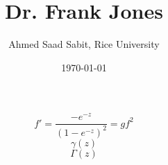 \documentclass[letter]{article}
\title{Dr. Frank Jones}
\author{Ahmed Saad Sabit, Rice University}
\date{\today}
\begin{document}
\maketitle 
\[
f' = \frac{- e^{-z}}{(1 - e^{-z})^2} = g f^2
\] 
\[
\gamma(z)
\]
\[
\Gamma(z)
\] 
\[

\] 
\end{document}
